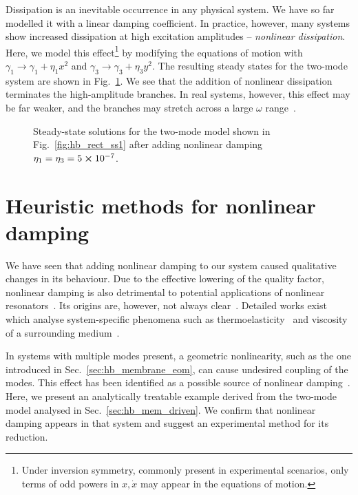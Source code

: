 Dissipation is an inevitable occurrence in any physical system. We have so far modelled it with a linear damping coefficient. In practice, however, many systems show increased dissipation at high excitation amplitudes -- \textit{nonlinear dissipation}. Here, we model this effect\footnote{Under inversion symmetry, commonly present in experimental scenarios, only terms of odd powers in $x, \dot{x}$ may appear in the equations of motion.} by modifying the equations of motion with $\gamma_1 \rightarrow \gamma_1 + \eta_1 x^2$ and $\gamma_3 \rightarrow \gamma_3 + \eta_3 y^2$. The resulting steady states for the two-mode system are shown in Fig.~\ref{fig:hb_duff_nld}. We see that the addition of nonlinear dissipation terminates the high-amplitude branches. In real systems, however, this effect may be far weaker, and the branches may stretch across a large $\omega$ range~\cite{Yang_2021a}. 
\begin{figure} [h!]
	\centering
	
	\caption{Steady-state solutions for the two-mode model shown in Fig.~\ref{fig:hb_rect_ss1} after adding nonlinear damping $\eta_1 = \eta_3 = 5\cross 10^{-7}$.}
	\label{fig:hb_duff_nld}
\end{figure} 

\section{Heuristic methods for nonlinear damping}

We have seen that adding nonlinear damping to our system caused qualitative changes in its behaviour. Due to the effective lowering of the quality factor, nonlinear damping is also detrimental to potential applications of nonlinear resonators~\cite{Catalini_2021, Kosata_2020}. Its origins are, however, not always clear~\cite{Bachtold_2022, Steeneken_2021}. Detailed works exist which analyse system-specific phenomena such as thermoelasticity~\cite{Atalaya_2016, Cleland} and viscosity of a surrounding medium~\cite{Aureli_2010}. 

In systems with multiple modes present, a geometric nonlinearity, such as the one introduced in Sec.~\ref{sec:hb_membrane_eom}, can cause undesired coupling of the modes. This effect has been identified as a possible source of nonlinear damping~\cite{Kecskekler_2021, Guttinger2017, Dykman_1975}. Here, we present an analytically treatable example derived from the two-mode model analysed in Sec.~\ref{sec:hb_mem_driven}. We confirm that nonlinear damping appears in that system and suggest an experimental method for its reduction. 

